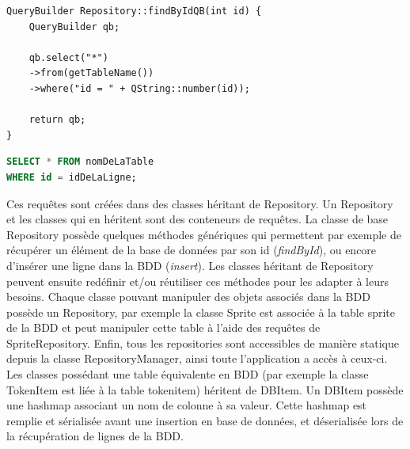 \begin{lstlisting}[caption=Exemple d'utilisation de QueryBuilder]
QueryBuilder Repository::findByIdQB(int id) {
    QueryBuilder qb;

    qb.select("*")
    ->from(getTableName())
    ->where("id = " + QString::number(id));

    return qb;
}
\end{lstlisting}

\begin{lstlisting}[language=SQL,caption=Equivalent en SQL de la requête créée avec le QueryBuilder]
SELECT * FROM nomDeLaTable 
WHERE id = idDeLaLigne;
\end{lstlisting}

Ces requêtes sont créées dans des classes héritant de Repository. Un Repository et les classes qui en héritent sont des conteneurs de requêtes. La classe de base Repository possède quelques méthodes génériques qui permettent par exemple de récupérer un élément de la base de données par son id (\emph{findById}), ou encore d'insérer une ligne dans la BDD (\emph{insert}). Les classes héritant de Repository peuvent ensuite redéfinir et/ou réutiliser ces méthodes pour les adapter à leurs besoins. Chaque classe pouvant manipuler des objets associés dans la BDD possède un Repository, par exemple la classe Sprite est associée à la table sprite de la BDD et peut manipuler cette table à l'aide des requêtes de SpriteRepository. Enfin, tous les repositories sont accessibles de manière statique depuis la classe RepositoryManager, ainsi toute l'application a accès à ceux-ci.\\

Les classes possédant une table équivalente en BDD (par exemple la classe TokenItem est liée à la table tokenitem) héritent de DBItem. Un DBItem possède une hashmap associant un nom de colonne à sa valeur. Cette hashmap est remplie et sérialisée avant une insertion en base de données, et déserialisée lors de la récupération de lignes de la BDD.